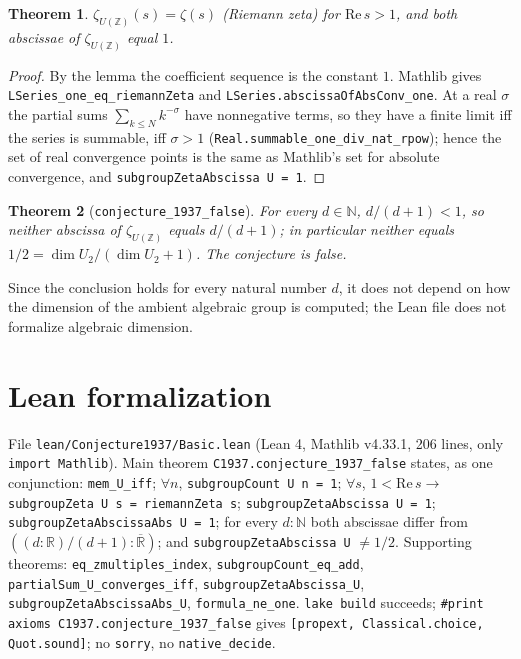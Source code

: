 \documentclass[11pt]{article}
\newtheorem{theorem}{Theorem}
\theoremstyle{definition}
\newcommand{\Z}{\mathbb Z}
\begin{document}
\begin{theorem}
$\zeta_{U(\Z)}(s)=\zeta(s)$ (Riemann zeta) for $\mathrm{Re}\,s>1$, and both abscissae of
$\zeta_{U(\Z)}$ equal $1$.
\end{theorem}
\begin{proof}
By the lemma the coefficient sequence is the constant $1$. Mathlib gives
\texttt{LSeries\_one\_eq\_riemannZeta} and \texttt{LSeries.abscissaOfAbsConv\_one}. At a real
$\sigma$ the partial sums $\sum_{k\le N}k^{-\sigma}$ have nonnegative terms, so they have a
finite limit iff the series is summable, iff $\sigma>1$ (\texttt{Real.summable\_one\_div\_nat\_rpow});
hence the set of real convergence points is the same as Mathlib's set for absolute convergence,
and \texttt{subgroupZetaAbscissa U = 1}.
\end{proof}

\begin{theorem}[\texttt{conjecture\_1937\_false}]
For every $d\in\mathbb N$, $d/(d+1)<1$, so neither abscissa of $\zeta_{U(\Z)}$ equals $d/(d+1)$;
in particular neither equals $1/2=\dim U_2/(\dim U_2+1)$. The conjecture is false.
\end{theorem}
Since the conclusion holds for every natural number $d$, it does not depend on how the
dimension of the ambient algebraic group is computed; the Lean file does not formalize algebraic
dimension.

\section{Lean formalization}
File \texttt{lean/Conjecture1937/Basic.lean} (Lean 4, Mathlib v4.33.1, 206 lines, only
\texttt{import Mathlib}). Main theorem \texttt{C1937.conjecture\_1937\_false} states, as one
conjunction: \texttt{mem\_U\_iff}; $\forall n$, \texttt{subgroupCount U n = 1};
$\forall s$, $1<\mathrm{Re}\,s\to$ \texttt{subgroupZeta U s = riemannZeta s};
\texttt{subgroupZetaAbscissa U = 1}; \texttt{subgroupZetaAbscissaAbs U = 1}; for every $d:\mathbb N$
both abscissae differ from $((d:\mathbb R)/(d+1):\overline{\mathbb R})$; and
\texttt{subgroupZetaAbscissa U} $\ne 1/2$. Supporting theorems: \texttt{eq\_zmultiples\_index},
\texttt{subgroupCount\_eq\_add}, \texttt{partialSum\_U\_converges\_iff},
\texttt{subgroupZetaAbscissa\_U}, \texttt{subgroupZetaAbscissaAbs\_U}, \texttt{formula\_ne\_one}.
\texttt{lake build} succeeds; \texttt{\#print axioms C1937.conjecture\_1937\_false} gives
\texttt{[propext, Classical.choice, Quot.sound]}; no \texttt{sorry}, no \texttt{native\_decide}.
\end{document}
